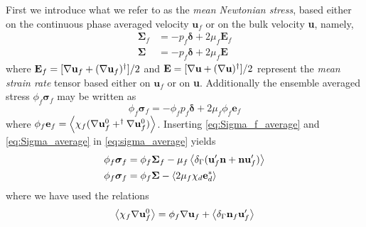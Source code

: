 First we introduce what we refer to as the \textit{mean Newtonian stress}, based either on the continuous phase averaged velocity $\textbf{u}_f$ or on the bulk velocity \textbf{u}, namely,
\begin{align}
    \bm\Sigma_f 
    &
    = -p_f \bm\delta + 2\mu_f \textbf{E}_f    
    \label{eq:Sigma_f_average}
    \\
    \bm\Sigma &
    = -p_f\bm\delta + 2 \mu_f \textbf{E}
    \label{eq:Sigma_average}
\end{align}
where $\textbf{E}_f = [\mathbf{\nabla} \textbf{u}_f + (\mathbf{\nabla} \textbf{u}_f)^{\dagger}]/2$ and $\textbf{E} =[\mathbf{\nabla} \textbf{u} + (\mathbf{\nabla} \textbf{u})^{\dagger}]/2$ represent the \textit{mean strain rate} tensor based either on $\textbf{u}_f$ or on \textbf{u}. 
Additionally the ensemble averaged stress $\phi_f \bm\sigma_f$ may be written as 
\begin{equation}
    \phi_f \bm\sigma_f = - \phi _f p_f \bm\delta + 2 \mu_ f \phi_f \textbf{e}_f
    \label{eq:sigma_average}
\end{equation}
where $\phi _f \textbf{e}_f = \left<\chi_f (\mathbf{\nabla} \textbf{u}_f^0 + ^\dagger \mathbf{\nabla} \textbf{u}_f^0)\right>$. 
Inserting \ref{eq:Sigma_f_average} and \ref{eq:Sigma_average} in  \ref{eq:sigma_average} yields
\begin{align}
    \phi_f \bm\sigma_f 
    &=
    \phi_f \bm\Sigma_f
    - \mu_f \avg{\delta_\Gamma( \textbf{u}_f'  \textbf{n} +  \textbf{n} \textbf{u}_f' )}
    \label{eq:stress_closure}\\
    \phi_f \bm\sigma_f 
    &=
    \phi_f \bm\Sigma
    - \avg{2\mu_f \chi_d \textbf{e}_d^*}
    \label{eq:stress_closure1}
\end{align}
where we have used the relations 
\begin{equation}
    \avg{\chi_f \grad \textbf{u}_f^0}
    = 
    \phi_f \grad  \textbf{u}_f
    + \avg{\delta_\Gamma \textbf{n}_f \textbf{u}_f'}
    \label{eq:first_rel}
\end{equation}
